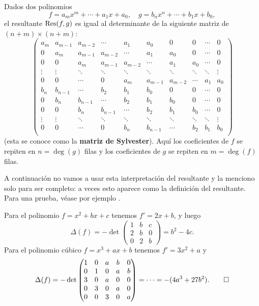 \begin{proposicion}
  \label{prop:determinante-de-sylvester}
  Dados dos polinomios
  \[ f = a_m x^m + \cdots + a_1 x + a_0, \quad
     g = b_n x^n + \cdots + b_1 x + b_0, \]
  el resultante $\operatorname{Res} (f,g)$ es igual al determinante de la siguiente matriz
  de $(n+m) \times (n+m)$:
  \[ \begin{pmatrix}
    a_m & a_{m-1} & a_{m-2} & \cdots & a_1 & a_0 & 0 & 0 & \cdots & 0 \\
    0 & a_m & a_{m-1} & a_{m-2} & \cdots & a_1 & a_0 & 0 & \cdots & 0 \\
    0 & 0 & a_m & a_{m-1} & a_{m-2} & \cdots & a_1 & a_0 & \cdots & 0 \\
    \vdots & \vdots & \ddots & \ddots & \ddots & \ddots & \ddots & \ddots & \ddots & \vdots \\
    0 & 0 & \cdots & 0 & a_m & a_{m-1} & a_{m-2} & \cdots & a_1 & a_0 \\
    b_n & b_{n-1} & \cdots & b_2 & b_1 & b_0 & 0 & 0 & \cdots & 0 \\
    0 & b_n & b_{n-1} & \cdots & b_2 & b_1 & b_0 & 0 & \cdots & 0 \\
    0 & 0 & b_n & b_{n-1} & \cdots & b_2 & b_1 & b_0 & \cdots & 0 \\
    \vdots & \vdots & \ddots & \ddots & \ddots & \ddots & \ddots & \ddots & \ddots & \vdots \\
    0 & 0 & \cdots & 0 & b_n & b_{n-1} & \cdots & b_2 & b_1 & b_0 \\
  \end{pmatrix} \]
  (esta se conoce como la \textbf{matriz de Sylvester}). Aquí los coeficientes
  de $f$ se repiten en $n = \deg (g)$ filas y los coeficientes de $g$
  se repiten en $m = \deg (f)$ filas.
\end{proposicion}

A continuación no vamos a usar esta interpretación del resultante y la menciono
solo para ser completo: a veces esto aparece como la definición del resultante.
Para una prueba, véase por ejemplo \cite[\S 3.3]{Cohen-GTM138}.

\begin{ejemplo}
  Para el polinomio $f = x^2 + bx + c$ tenemos $f' = 2x + b$, y luego
  \[ \Delta (f) = -\det \begin{pmatrix}
    1 & b & c \\
    2 & b & 0 \\
    0 & 2 & b
  \end{pmatrix} = b^2 - 4c. \]
  Para el polinomio cúbico $f = x^3 + ax + b$ tenemos $f' = 3x^2 + a$ y
  \[ \Delta (f) = -\det \begin{pmatrix}
    1 & 0 & a & b & 0 \\
    0 & 1 & 0 & a & b \\
    3 & 0 & a & 0 & 0 \\
    0 & 3 & 0 & a & 0 \\
    0 & 0 & 3 & 0 & a
  \end{pmatrix} = \cdots = - (4a^3 + 27b^2). \qedhere \]
\end{ejemplo}

